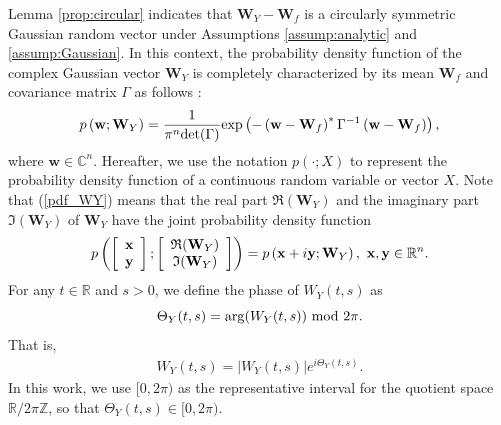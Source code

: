 \documentclass{amsart}
\begin{document}
Lemma \ref{prop:circular} indicates that $\mathbf{W}_{Y}-\mathbf{W}_{f}$ is a circularly symmetric Gaussian random vector under Assumptions \ref{assump:analytic} and \ref{assump:Gaussian}.
In this context, the probability density function of the complex Gaussian vector $\mathbf{W}_{Y}$
is completely characterized by its mean $\mathbf{W}_{f}$ and covariance matrix $\Gamma$ as follows
\cite{schreier2010statistical}:
\begin{align}\label{pdf_WY}
p\left(\mathbf{w};\mathbf{W}_{Y}\right)
= \frac{1}{\pi^{n}\textup{det}(\Gamma)}
\textup{exp}\left(-\left(\mathbf{w}-\mathbf{W}_{f}\right)^{*}\Gamma^{-1}\left(\mathbf{w}-\mathbf{W}_{f}\right)\right),
\end{align}
where $\mathbf{w}\in \mathbb{C}^{n}$.
Hereafter, we use the notation $p(\cdot;X)$ to represent the probability density function of a continuous random variable or vector $X$.
Note that (\ref{pdf_WY}) means that the real part $\mathfrak{R}(\mathbf{W}_{Y})$
and the imaginary part $\mathfrak{I}(\mathbf{W}_{Y})$ of $\mathbf{W}_{Y}$ have the joint probability density function
\begin{align}\notag
p\left(\left[\begin{array}{c}\mathbf{x}\\\mathbf{y}\end{array}\right];\left[\begin{array}{c}\mathfrak{R}(\mathbf{W}_{Y})\\
\mathfrak{I}(\mathbf{W}_{Y})\end{array}\right]\right)
=p\left(\mathbf{x}+i\mathbf{y};\mathbf{W}_{Y}\right),\ \mathbf{x},\mathbf{y}\in \mathbb{R}^{n}.
\end{align}
For any $t\in \mathbb{R}$ and $s>0$, we define the phase of $W_{Y}(t,s)$ as
$$\Theta_{Y}(t,s) = \arg(W_{Y}(t,s))\ \textup{mod}\ 2\pi.$$
That is,
\begin{align}\label{def:Theta_Y}
W_{Y}(t,s) = |W_{Y}(t,s)|e^{i\Theta_{Y}(t,s)}.
\end{align}
In this work, we use $[0,2\pi)$ as the representative interval for the quotient space $\mathbb{R}/2\pi \mathbb{Z}$,
so that $\Theta_{Y}(t,s)\in[0,2\pi).$
\end{document}
